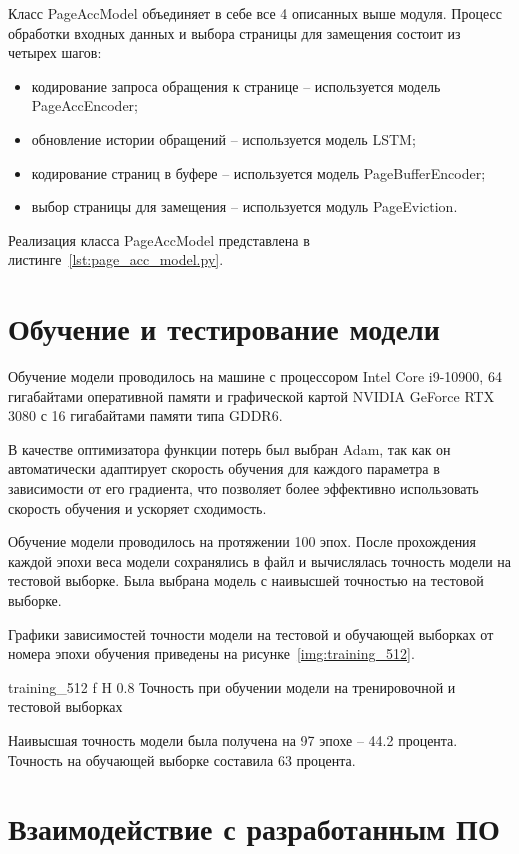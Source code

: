 Класс PageAccModel объединяет в себе все 4 описанных выше модуля.
Процесс обработки входных данных и выбора страницы для замещения состоит из четырех шагов:
\begin{itemize}
	\item кодирование запроса обращения к странице -- используется модель PageAccEncoder;
	\item обновление истории обращений -- используется модель LSTM;
	\item кодирование страниц в буфере -- используется модель PageBufferEncoder;
	\item выбор страницы для замещения -- используется модуль PageEviction.
\end{itemize}
Реализация класса PageAccModel представлена в листинге~\ref{lst:page_acc_model.py}.

\section{Обучение и тестирование модели}

Обучение модели проводилось на машине с процессором Intel Core i9-10900, 64 гигабайтами оперативной памяти и графической картой NVIDIA GeForce RTX 3080 с 16 гигабайтами памяти типа GDDR6.

В качестве оптимизатора функции потерь был выбран Adam, так как он автоматически адаптирует скорость обучения для каждого параметра в зависимости от его градиента, что позволяет более эффективно использовать скорость обучения и ускоряет сходимость.

Обучение модели проводилось на протяжении 100 эпох.
После прохождения каждой эпохи веса модели сохранялись в файл и вычислялась точность модели на тестовой выборке.
Была выбрана модель с наивысшей точностью на тестовой выборке.

Графики зависимостей точности модели на тестовой и обучающей выборках от номера эпохи обучения приведены на рисунке~\ref{img:training_512}.

{training_512} %
{f} %
{H} %
{0.8\textwidth} %
{Точность при обучении модели на тренировочной и тестовой выборках} %

Наивысшая точность модели была получена на 97 эпохе -- 44.2 процента.
Точность на обучающей выборке составила 63 процента.

\section{Взаимодействие с разработанным ПО}

